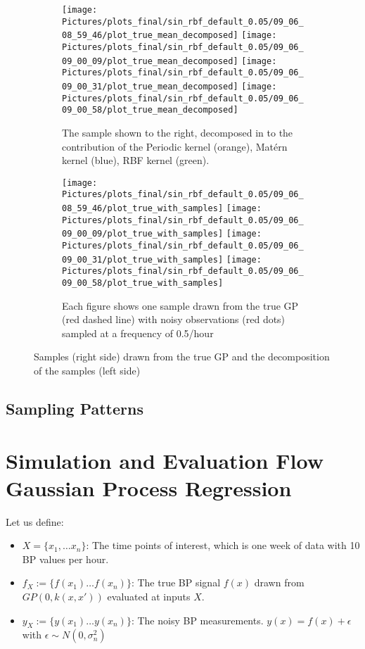 \begin{figure}
\centering
\begin{subfigure}{.45\textwidth}
    \centering
    \texttt{[image: Pictures/plots\_final/sin\_rbf\_default\_0.05/09\_06\_08\_59\_46/plot\_true\_mean\_decomposed]}
    \texttt{[image: Pictures/plots\_final/sin\_rbf\_default\_0.05/09\_06\_09\_00\_09/plot\_true\_mean\_decomposed]}
    \texttt{[image: Pictures/plots\_final/sin\_rbf\_default\_0.05/09\_06\_09\_00\_31/plot\_true\_mean\_decomposed]}
    \texttt{[image: Pictures/plots\_final/sin\_rbf\_default\_0.05/09\_06\_09\_00\_58/plot\_true\_mean\_decomposed]}
  \caption{The sample shown to the right, decomposed in to the contribution of the Periodic kernel (orange),
      Matérn kernel (blue), RBF kernel (green).}
  \label{fig:true_mean_decomposed}
\end{subfigure}\hfill
\begin{subfigure}{.45\textwidth}
    \centering
    \texttt{[image: Pictures/plots\_final/sin\_rbf\_default\_0.05/09\_06\_08\_59\_46/plot\_true\_with\_samples]}
    \texttt{[image: Pictures/plots\_final/sin\_rbf\_default\_0.05/09\_06\_09\_00\_09/plot\_true\_with\_samples]}
    \texttt{[image: Pictures/plots\_final/sin\_rbf\_default\_0.05/09\_06\_09\_00\_31/plot\_true\_with\_samples]}
    \texttt{[image: Pictures/plots\_final/sin\_rbf\_default\_0.05/09\_06\_09\_00\_58/plot\_true\_with\_samples]}
  \caption{Each figure shows one sample drawn from the true GP (red dashed line) with noisy observations
      (red dots) sampled at a frequency of 0.5/hour}
  \label{fig:sub2}
\end{subfigure}
\caption{Samples (right side) drawn from the true GP and the decomposition of the samples (left side)}
\label{fig:true_gp_samples}
\end{figure}


\subsection{Sampling Patterns}\label{subsec:sampling-patterns}


\section{Simulation and Evaluation Flow Gaussian Process Regression}

Let us define:
    \begin{itemize}
        \item $X=\{x_1, \dots x_n\}$: The time points of interest, which is one week of data with 10 BP values per hour.
        \item $f_X := \{f(x_1) \dots f(x_n)\}$: The true BP signal $f(x)$ drawn from $GP(0, k(x,x'))$ evaluated at inputs $X$.
        \item $y_X := \{y(x_1) \dots y(x_n)\}$: The noisy BP measurements. $y(x)= f(x) + \epsilon$ with $\epsilon \sim N(0, \sigma_n^2)$
    \end{itemize}


